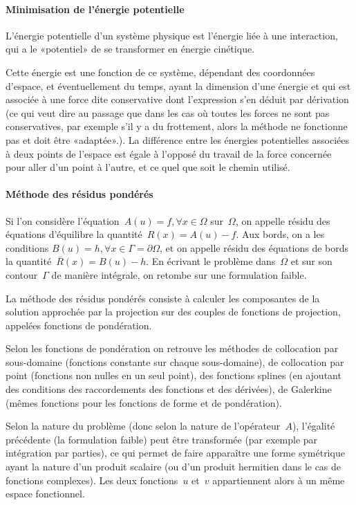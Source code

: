 \medskip
\paragraph{Minimisation de l'énergie potentielle}
L'énergie potentielle d'un système physique est l'énergie liée à une interaction, qui a le
«potentiel» de se transformer en énergie cinétique.

Cette énergie est une fonction de ce système, dépendant des coordonnées d'espace,
et éventuellement du temps, ayant la dimension d'une énergie et qui est associée à une
force dite conservative dont l'expression s'en déduit par dérivation (ce qui veut dire au passage
que dans les cas où toutes les forces ne sont pas conservatives, par exemple s'il y a
du frottement, alors la méthode ne fonctionne pas et doit être «adaptée».).
La différence entre les énergies potentielles associées à deux points de l'espace est
égale à l'opposé du travail de la force concernée pour aller d'un point à l'autre, et ce
quel que soit le chemin utilisé.

\medskip
\paragraph{Méthode des résidus pondérés}\label{Sec-ResPond}
Si l'on considère l'équation~$A(u)=f, \forall x\in\Omega$ sur~$\Omega$, on appelle résidu
des équations d'équilibre la quantité~$R(x)=A(u)-f$. Aux bords, on a les conditions
$B(u)=h, \forall x\in\Gamma=\partial\Omega$, et on appelle résidu des équations de bords
la quantité~$\overline{R}(x)=B(u)-h$. En écrivant le problème dans~$\Omega$ et sur
son contour~$\Gamma$ de manière intégrale, on retombe sur une formulation faible.

La méthode des résidus pondérés consiste à calculer les composantes de la
solution approchée par la projection sur des couples de fonctions de projection,
appelées fonctions de pondération.

Selon les fonctions de pondération on retrouve les méthodes de collocation par
sous-domaine (fonctions constante sur chaque sous-domaine), de collocation par point
(fonctions non nulles en un seul point), des fonctions splines (en ajoutant des conditions
des raccordements des fonctions et des dérivées), de Galerkine
(mêmes fonctions
pour les fonctions de forme et de pondération).

\medskip
Selon la nature du problème (donc selon la nature de l'opérateur~$A$),
l'égalité précédente (la formulation faible) peut être transformée
(par exemple par intégration par parties), ce qui permet de faire apparaître une
forme symétrique ayant la nature d'un produit scalaire (ou d'un produit hermitien dans le cas
de fonctions complexes).
Les deux fonctions~$u$ et~$v$ appartiennent alors à un même espace fonctionnel.

